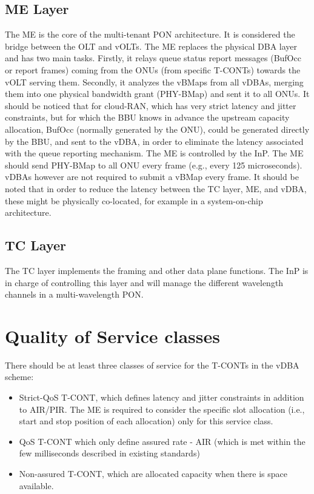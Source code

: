 \subsection{\acf{ME} Layer}
The \ac{ME} is the core of the multi-tenant \ac{PON} architecture. It is considered the bridge between the \ac{OLT} and \acp{vOLT}. The \ac{ME} replaces the physical \ac{DBA} layer and has two main tasks. Firstly, it relays queue status report messages (BufOcc or report frames) coming from the \acp{ONU} (from specific \acp{T-CONT}) towards the \ac{vOLT} serving them. Secondly, it analyzes the \acp{vBMap} from all \acp{vDBA}, merging them into one physical bandwidth grant (PHY-\ac{BMap}) and sent it to all \acp{ONU}. It should be noticed that for cloud-RAN, which has very strict latency and jitter constraints, but for which the \ac{BBU} knows in advance the upstream capacity allocation, BufOcc (normally generated by the \ac{ONU}), could be generated directly by the \ac{BBU}, and sent to the \ac{vDBA}, in order to eliminate the latency associated with the queue reporting mechanism. The \ac{ME} is controlled by the \ac{InP}. The \ac{ME} should send PHY-\ac{BMap} to all \ac{ONU} every frame (e.g., every 125 microseconds). \acp{vDBA} however are not required to submit a \ac{vBMap} every frame. It should be noted that in order to reduce the latency between the \ac{TC} layer, \ac{ME}, and \ac{vDBA}, these might be physically co-located, for example in a system-on-chip architecture.


\subsection{\acf{TC} Layer} 
The \ac{TC} layer implements the framing and other data plane functions. The \ac{InP} is in charge of controlling this layer and will manage the different wavelength channels in a multi-wavelength \ac{PON}. 



\section{Quality of Service classes} There should be at least three classes of service for the \acp{T-CONT} in the \ac{vDBA} scheme:
\begin{itemize}
    \item Strict-\ac{QoS} \ac{T-CONT}, which defines latency and jitter constraints in addition to AIR/PIR. The \ac{ME} is required to consider the specific slot allocation (i.e., start and stop position of each allocation) only for this service class.
    \item \ac{QoS} \ac{T-CONT} which only define assured rate - AIR (which is met within the few milliseconds described in existing standards) 
    \item Non-assured \ac{T-CONT}, which are allocated capacity when there is space available.
\end{itemize}

